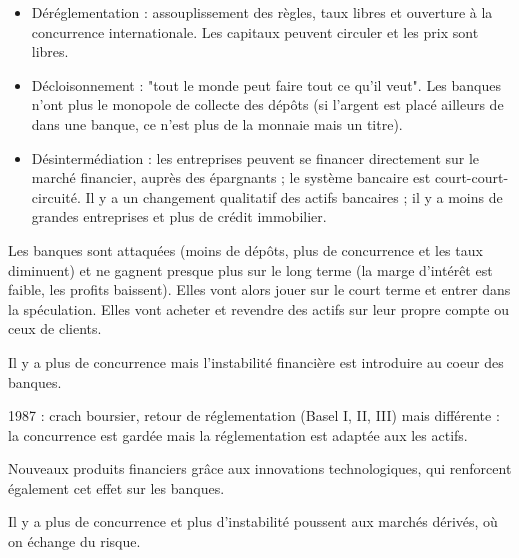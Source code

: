 	
	
	\begin{itemize}
		\item Déréglementation : assouplissement des règles, taux libres et ouverture à la concurrence internationale. Les capitaux peuvent circuler et les prix sont libres.
		\item Décloisonnement : "tout le monde peut faire tout ce qu'il veut". Les banques n'ont plus le monopole de collecte des dépôts (si l'argent est placé ailleurs de dans une banque, ce n'est plus de la monnaie mais un titre).
		\item Désintermédiation :  les entreprises peuvent se financer directement sur le marché financier, auprès des épargnants ; le système bancaire est court-court-circuité. Il y a un changement qualitatif des actifs bancaires ; il y a moins de grandes entreprises et plus de crédit immobilier.
	\end{itemize}
	
	Les banques sont attaquées (moins de dépôts, plus de concurrence et les taux diminuent) et ne gagnent presque plus sur le long terme (la marge d'intérêt est faible, les profits baissent). Elles vont alors jouer sur le court terme et entrer dans la spéculation. Elles vont acheter et revendre des actifs sur leur propre compte ou ceux de clients.
	
	Il y a plus de concurrence mais l'instabilité financière est introduire au coeur des banques.
	
	1987 : crach boursier, retour de réglementation (Basel I, II, III) mais différente : la concurrence est gardée mais la réglementation est adaptée aux les actifs.
	
	Nouveaux produits financiers grâce aux innovations technologiques, qui renforcent également cet effet sur les banques.
	
	Il y a plus de concurrence et plus d'instabilité poussent aux marchés dérivés, où on échange du risque.